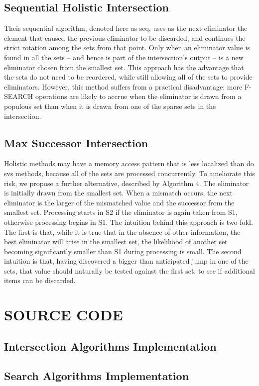 \documentclass[paper=a4, fontsize=11pt]{scrartcl} %
\numberwithin{equation}{section} %
\numberwithin{figure}{section} %
\numberwithin{table}{section} %
\begin{document}
\subsection{Sequential Holistic Intersection}

Their sequential algorithm, denoted here
as seq, uses as the next eliminator the element that caused the previous eliminator to be discarded, and continues the strict rotation among the sets from that point. Only when an eliminator value is found in all the sets – and hence is part of the intersection’s output – is a new eliminator chosen from the smallest set. This approach has the advantage that the
sets do not need to be reordered, while still allowing all of the sets to provide eliminators. However, this method suffers from a practical disadvantage: more F-SEARCH operations are likely to accrue when the eliminator is drawn from a populous set than when it is drawn
from one of the sparse sets in the intersection.

\subsection{Max Successor Intersection}

Holistic methods may have a memory access pattern that is less localized than do svs methods, because all of the sets are processed concurrently. To ameliorate this risk, we propose a further alternative, described by Algorithm 4. The eliminator is initially drawn from the smallest set. When a mismatch occurs, the next eliminator is the larger of the mismatched value and the successor from the smallest set. Processing starts in S2 if the eliminator is again taken from S1, otherwise processing begins in S1. The intuition behind this approach is two-fold. The first is that, while it is true that in the absence of other information, the best eliminator will arise in the smallest set, the likelihood of another set becoming significantly smaller than S1 during processing is small. The second intuition is that, having discovered a bigger than anticipated jump in one of the sets, that value should naturally be tested against the first set, to see if additional items can be discarded.

\newpage
\section{SOURCE CODE}
\subsection{Intersection Algorithms Implementation}


\newpage
\subsection{Search Algorithms Implementation}

\end{document}
